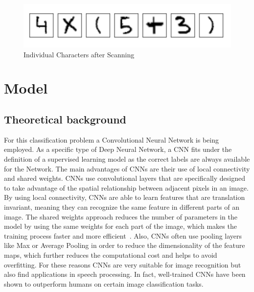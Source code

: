 \documentclass[@CLASSOPTIONS@]{tumarticle}
\begin{document}
\begin{figure}
    \begin{minipage}{0.48\textwidth}
     \centering
     \includegraphics[width=.9\linewidth]{figures/real_data_3}
     \caption{Individual Characters after Scanning}\label{Fig:Data6}
   \end{minipage}
\end{figure}

\section{Model}
\label{sec:implementation}


\subsection{Theoretical background}

For this classification problem a Convolutional Neural Network is being employed.
As a specific type of Deep Neural Network, a CNN fits under the definition of a supervised learning model as the correct
labels are always available for the Network.
The main advantages of CNNs are their use of local connectivity and shared weights.
CNNs use convolutional layers that are specifically designed to take advantage of the spatial relationship between
adjacent pixels in an image.
By using local connectivity, CNNs are able to learn features that are translation invariant, meaning they can
recognize the same feature in different parts of an image.
The shared weights approach reduces the number of parameters in the model by using the same weights for each part of the
image, which makes the training process faster and more efficient~\cite{reviewDL}.
Also, CNNs often use pooling layers like Max or Average Pooling in order to reduce the dimensionality of the feature maps,
which further reduces the computational cost and helps to avoid overfitting.
For these reasons CNNs are very suitable for image recognition but also find applications in speech
processing.
In fact, well-trained CNNs have been shown to outperform humans on certain image classification tasks.
\end{document}
